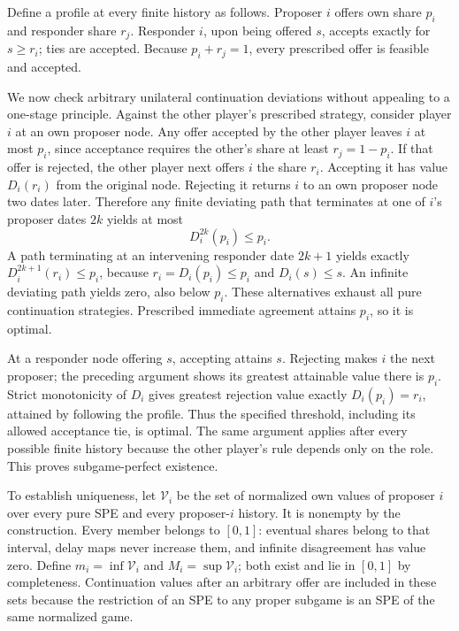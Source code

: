 \documentclass[11pt]{article}
\begin{document}
Define a profile at every finite history as follows. Proposer $i$ offers own share $p_i$ and responder share $r_j$. Responder $i$, upon being offered $s$, accepts exactly for $s\ge r_i$; ties are accepted. Because $p_i+r_j=1$, every prescribed offer is feasible and accepted.

We now check arbitrary unilateral continuation deviations without appealing to a one-stage principle. Against the other player's prescribed strategy, consider player $i$ at an own proposer node. Any offer accepted by the other player leaves $i$ at most $p_i$, since acceptance requires the other's share at least $r_j=1-p_i$. If that offer is rejected, the other player next offers $i$ the share $r_i$. Accepting it has value $D_i(r_i)$ from the original node. Rejecting it returns $i$ to an own proposer node two dates later. Therefore any finite deviating path that terminates at one of $i$'s proposer dates $2k$ yields at most
\begin{equation}
 D_i^{2k}(p_i)\le p_i.
\end{equation}
A path terminating at an intervening responder date $2k+1$ yields exactly $D_i^{2k+1}(r_i)\le p_i$, because $r_i=D_i(p_i)\le p_i$ and $D_i(s)\le s$. An infinite deviating path yields zero, also below $p_i$. These alternatives exhaust all pure continuation strategies. Prescribed immediate agreement attains $p_i$, so it is optimal.

At a responder node offering $s$, accepting attains $s$. Rejecting makes $i$ the next proposer; the preceding argument shows its greatest attainable value there is $p_i$. Strict monotonicity of $D_i$ gives greatest rejection value exactly $D_i(p_i)=r_i$, attained by following the profile. Thus the specified threshold, including its allowed acceptance tie, is optimal. The same argument applies after every possible finite history because the other player's rule depends only on the role. This proves subgame-perfect existence.

To establish uniqueness, let $\mathcal V_i$ be the set of normalized own values of proposer $i$ over every pure SPE and every proposer-$i$ history. It is nonempty by the construction. Every member belongs to $[0,1]$: eventual shares belong to that interval, delay maps never increase them, and infinite disagreement has value zero. Define $m_i=\inf\mathcal V_i$ and $M_i=\sup\mathcal V_i$; both exist and lie in $[0,1]$ by completeness. Continuation values after an arbitrary offer are included in these sets because the restriction of an SPE to any proper subgame is an SPE of the same normalized game.
\end{document}
